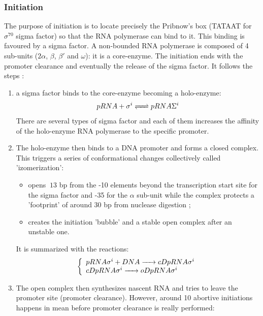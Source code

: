 \subsubsection{Initiation}
The purpose of initiation is to locate precisely the Pribnow's box (TATAAT for $\sigma^{70}$ sigma factor) so that the RNA polymerase can bind to it. This binding is favoured by a sigma factor. A non-bounded RNA polymerase is composed of 4 sub-units ($2\alpha$, $\beta$, $\beta'$ and $\omega$): it is a core-enzyme. The initiation ends with the promoter clearance and eventually the release of the sigma factor. It follows the steps \citep{SdH:11}:
\begin{enumerate}
  \item a sigma factor binds to the core-enzyme becoming a holo-enzyme:
    $$
      \reactionRev{pRNA + \sigma^i}{pRNA\Sigma^i}{}{}
    $$
    There are several types of sigma factor and each of them increases the affinity of the holo-enzyme RNA polymerase to the specific promoter.
  \item The holo-enzyme then binds to a DNA promoter and forms a closed complex. This triggers a series of conformational changes collectively called 'izomerization':
      \begin{itemize}
        \item opens $~13$ bp from the -10 elements beyond the transcription start site for the sigma factor and -35 for the $\alpha$ sub-unit while the complex protects a 'footprint' of around 30 bp from nuclease digestion \citep{vHi:98};
        \item creates the initiation 'bubble' and a stable open complex after an unstable one.
      \end{itemize}
      It is summarized with the reactions:
    $$
      \left\{
        \begin{array}{l}
          \reactionIrr{pRNA\sigma^i + DNA}{cDpRNA\sigma^i}{}{} \\
          \reactionIrr{cDpRNA\sigma^i}{oDpRNA\sigma^i}{}{} \\
        \end{array}
      \right.
    $$
  \item The open complex then synthesizes nascent RNA and tries to leave the promoter site (promoter clearance). However, around 10 abortive initiations happens \citep{GoN:09} in mean before promoter clearance is really performed:

\end{enumerate}
